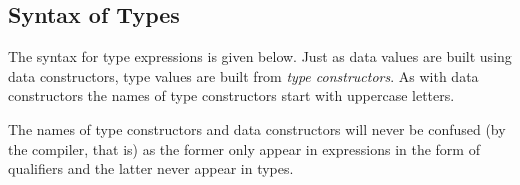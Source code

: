 \subsection{Syntax of Types}   \label{typesyntax}

The syntax for \frege{} type expressions is given below. Just as data values are built using data constructors, type values are built from \emph{type constructors}. As with data constructors the names of type constructors start with uppercase letters.

The names of type constructors and data constructors will never be confused (by the compiler, that is) as the former only appear in expressions in the form of qualifiers and the latter never appear in types.

\begin{flushleft}
     
   \alt{}  \\
  \sym {=>}    \alt{} \\
 \sym{(}  \sym{)} \sym{\arrow{}}   
  \alt{}  \sym{\arrow{}}                            
  \alt{}  \\
  
	\alt{} \sym{(}  \sym{)} \label{constraint}\\
   \\
  \sym{\arrow{}}  
  \alt {}\\
    
  \alt {}\\
  
  \alt {}           
  \alt \sym{(}  \sym{)}
  \alt \sym{(}  \sym{,}  \sym{)} 
  \alt \sym{\bracka{}}  \sym{\brackz{}}  \\
  \\
  
\alt{} \sym{(}  \sym{)} \\
 
  \alt \sym{\bracka\brackz}  
  \alt \sym{()}              
  \alt \sym{(}\more{\sym{,}}\sym{)} \\
 
\end{flushleft}

